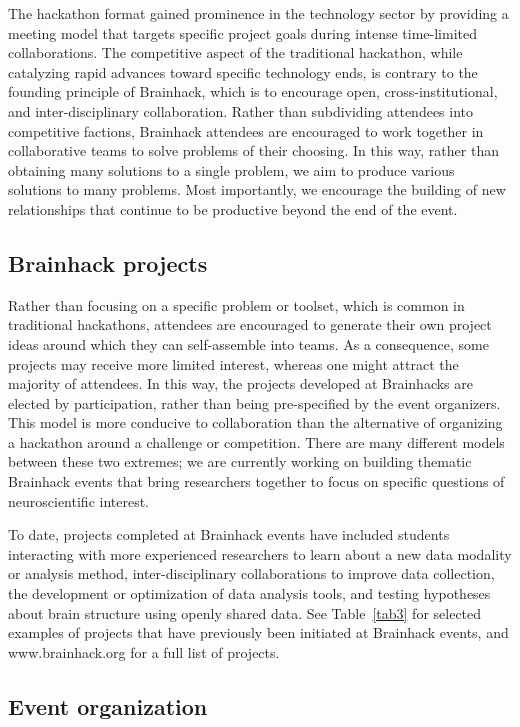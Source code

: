 \documentclass[11pt]{bmc_article_s50}
\begin{document}
The hackathon format gained prominence in the technology sector by providing a meeting model that targets specific project goals during intense time-limited collaborations. The competitive aspect of the traditional hackathon, while catalyzing rapid advances toward specific technology ends, is contrary to the founding principle of Brainhack, which is to encourage open, cross-institutional, and inter-disciplinary collaboration. Rather than subdividing attendees into competitive factions, Brainhack attendees are encouraged to work together in collaborative teams to solve problems of their choosing. In this way, rather than obtaining many solutions to a single problem, we aim to produce various solutions to many problems. Most importantly, we encourage the building of new relationships that continue to be productive beyond the end of the event.

\subsection*{Brainhack projects}

Rather than focusing on a specific problem or toolset, which is common in traditional hackathons, attendees are encouraged to generate their own project ideas around which they can self-assemble into teams. As a consequence, some projects may receive more limited interest, whereas one might attract the majority of attendees. In this way, the projects developed at Brainhacks are elected by participation, rather than being pre-specified by the event organizers. This model is more conducive to collaboration than the alternative of organizing a hackathon around a challenge or competition. There are many different models between these two extremes; we are currently working on building thematic Brainhack events that bring researchers together to focus on specific questions of neuroscientific interest.

To date, projects completed at Brainhack events have included students interacting with more experienced researchers to learn about a new data modality or analysis method, inter-disciplinary collaborations to improve data collection, the development or optimization of data analysis tools, and testing hypotheses about brain structure using openly shared data. See Table~\ref{tab3} for selected examples of projects that have previously been initiated at Brainhack events, and www.brainhack.org \cite{brainhackorg} for a full list of projects.

\subsection*{Event organization}
\end{document}
